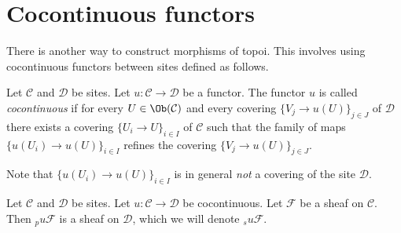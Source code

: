 \section{Cocontinuous functors}
\label{section-cocontinuous-functors}

\noindent
There is another way to construct morphisms of topoi.
This involves using cocontinuous functors between sites defined as
follows.

\begin{definition}
\label{definition-cocontinuous}
Let $\mathcal{C}$ and $\mathcal{D}$ be sites.
Let $u : \mathcal{C} \to \mathcal{D}$ be a functor.
The functor $u$ is called {\it cocontinuous}
if for every $U \in \Ob(\mathcal{C})$
and every covering $\{V_j \to u(U)\}_{j \in J}$ of $\mathcal{D}$
there exists a covering
$\{U_i \to U\}_{i\in I}$ of $\mathcal{C}$
such that the family of maps $\{u(U_i) \to u(U)\}_{i \in I}$
refines the covering $\{V_j \to u(U)\}_{j \in J}$.
\end{definition}

\noindent
Note that $\{u(U_i) \to u(U)\}_{i \in I}$ is in general {\it not}
a covering of the site $\mathcal{D}$.

\begin{lemma}
\label{lemma-pu-sheaf}
Let $\mathcal{C}$ and $\mathcal{D}$ be sites.
Let $u : \mathcal{C} \to \mathcal{D}$ be cocontinuous.
Let $\mathcal{F}$ be a sheaf on $\mathcal{C}$.
Then ${}_pu\mathcal{F}$ is a sheaf on $\mathcal{D}$,
which we will denote ${}_su\mathcal{F}$.
\end{lemma}

